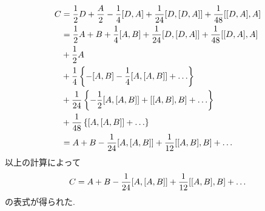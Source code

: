 \begin{align}
  C &=
       \frac{1}{2}D  + \frac{A}{2}
    -  \frac{1}{4}[D, A]
    +  \frac{1}{24}[D, [D, A]]
    +  \frac{1}{48}[[D, A], A]
    \notag \\
    &=
       \frac{1}{2}A + B
    +  \frac{1}{4}[A, B]
    +  \frac{1}{24}[D, [D, A]]
    +  \frac{1}{48}[[D, A], A]
    \notag \\
    &+ \frac{1}{2}A
    \notag \\
    &+ \frac{1}{4}
       \left\{
          - [A,B] - \frac{1}{4}[A, [A,B]] + \ldots
       \right\}
    \notag \\
    &+ \frac{1}{24}
    \left\{
      - \frac{1}{2}[A, [A,B]] + [[A,B], B] + \ldots
    \right\}
    \notag \\
    &+ \frac{1}{48}
    \left\{
      [A, [A,B]] + \ldots
    \right\}
    \notag \\
    &=
    A + B - \frac{1}{24}[A, [A,B]] + \frac{1}{12}[[A, B], B] + \dots
    \notag
\end{align}
以上の計算によって
\begin{equation}
  C
  =
  A + B - \frac{1}{24}[A, [A,B]] + \frac{1}{12}[[A, B], B] + \dots
  \notag
\end{equation}
の表式が得られた.







% 
% 

